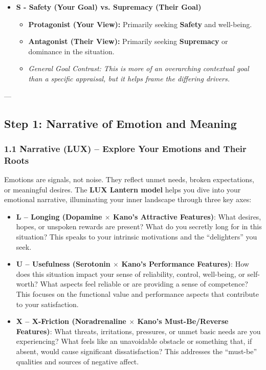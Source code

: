 \documentclass{article}
\begin{document}
\begin{itemize}[noitemsep,topsep=0pt]
    \item \textbf{S - Safety (Your Goal) vs. Supremacy (Their Goal)}
    \begin{itemize}[noitemsep,topsep=0pt]
        \item \textbf{Protagonist (Your View):} Primarily seeking \textbf{Safety} and well-being.
        \item \textbf{Antagonist (Their View):} Primarily seeking \textbf{Supremacy} or dominance in the situation.
        \item \textit{General Goal Contrast: This is more of an overarching contextual goal than a specific appraisal, but it helps frame the differing drivers.}
    \end{itemize}
\end{itemize}

---

\subsection{Step 1: Narrative of Emotion and Meaning}

\subsubsection{1.1 Narrative (LUX) – Explore Your Emotions and Their Roots}
Emotions are signals, not noise. They reflect unmet needs, broken expectations, or meaningful desires. The \textbf{LUX Lantern model} helps you dive into your emotional narrative, illuminating your inner landscape through three key axes:
\begin{itemize}[noitemsep,topsep=0pt]
    \item \textbf{L – Longing (Dopamine $\times$ Kano’s Attractive Features)}: What desires, hopes, or unspoken rewards are present? What do you secretly long for in this situation? This speaks to your intrinsic motivations and the ``delighters'' you seek.
    \item \textbf{U – Usefulness (Serotonin $\times$ Kano’s Performance Features)}: How does this situation impact your sense of reliability, control, well-being, or self-worth? What aspects feel reliable or are providing a sense of competence? This focuses on the functional value and performance aspects that contribute to your satisfaction.
    \item \textbf{X – X-Friction (Noradrenaline $\times$ Kano’s Must-Be/Reverse Features)}: What threats, irritations, pressures, or unmet basic needs are you experiencing? What feels like an unavoidable obstacle or something that, if absent, would cause significant dissatisfaction? This addresses the ``must-be'' qualities and sources of negative affect.
\end{itemize}
\end{document}
